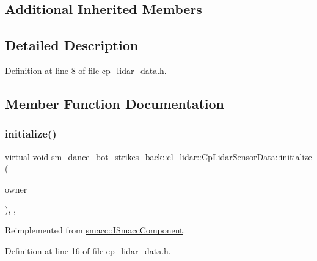 \subsection*{Additional Inherited Members}


\subsection{Detailed Description}


Definition at line 8 of file cp\+\_\+lidar\+\_\+data.\+h.



\subsection{Member Function Documentation}
\mbox{\label{classsm__dance__bot__strikes__back_1_1cl__lidar_1_1CpLidarSensorData_a8ea64aab6a48e8359a195a8766703c26}} 
\subsubsection{\texorpdfstring{initialize()}{initialize()}}
{\footnotesize\ttfamily virtual void sm\+\_\+dance\+\_\+bot\+\_\+strikes\+\_\+back\+::cl\+\_\+lidar\+::\+Cp\+Lidar\+Sensor\+Data\+::initialize (\begin{DoxyParamCaption}\item[{\hyperlink{classsmacc_1_1ISmaccClient}{smacc\+::\+I\+Smacc\+Client} $\ast$}]{owner }\end{DoxyParamCaption})\hspace{0.3cm}{\ttfamily [inline]}, {\ttfamily [override]}, {\ttfamily [virtual]}}



Reimplemented from \hyperlink{classsmacc_1_1ISmaccComponent_a3378552cb1a86aa26a07c0edc057448b}{smacc\+::\+I\+Smacc\+Component}.



Definition at line 16 of file cp\+\_\+lidar\+\_\+data.\+h.



